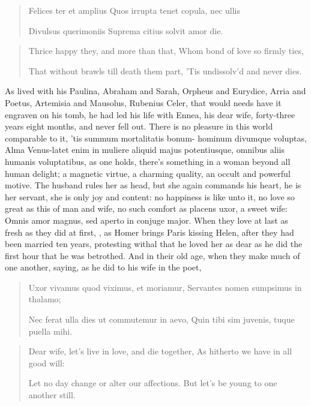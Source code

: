 \begin{latin}
\begin{verse}%
Felices ter et amplius
Quos irrupta tenet copula, nec ullis

Divulsus querimoniis
Suprema citius solvit amor die.
\end{verse}%
\end{latin}
\translationrule%
\begin{verse}%
Thrice happy they, and more than that,
Whom bond of love so firmly ties,

That without brawls till death them part,
'Tis undissolv'd and never dies.
\end{verse}%

As \Seneca{} lived with his Paulina, Abraham and Sarah, Orpheus and
Eurydice, Arria and Poetus, Artemisia and Mausolus, Rubenius Celer,
that would needs have it engraven on his tomb, he had led his life with
Ennea, his dear wife, forty-three years eight months, and never fell
out. There is no pleasure in this world comparable to it, 'tis summum
mortalitatis bonum- hominum divumque voluptas, Alma Venus-latet
enim in muliere aliquid majus potentiusque, omnibus aliis humanis
voluptatibus, as one holds, there's something in a woman beyond
all human delight; a magnetic virtue, a charming quality, an occult and
powerful motive. The husband rules her as head, but she again commands
his heart, he is her servant, she is only joy and content: no happiness
is like unto it, no love so great as this of man and wife, no such
comfort as placens uxor, a sweet wife: Omnis amor magnus,
sed aperto in conjuge major. When they love at last as fresh as they
did at first, , as Homer brings
Paris kissing Helen, after they had been married ten years, protesting
withal that he loved her as dear as he did the first hour that he was
betrothed. And in their old age, when they make much of one another,
saying, as he did to his wife in the poet,

\begin{latin}
\begin{verse}%
Uxor vivamus quod viximus, et moriamur,
Servantes nomen sumpsimus in thalamo;

Nec ferat ulla dies ut commutemur in aevo,
Quin tibi sim juvenis, tuque puella mihi.
\end{verse}%
\end{latin}
\translationrule%
\begin{verse}%
Dear wife, let's live in love, and die together,
As hitherto we have in all good will:

Let no day change or alter our affections.
But let's be young to one another still.
\end{verse}%

